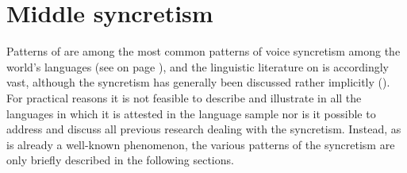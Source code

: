 \section{Middle syncretism} \label{sec:simple-syncretism:middle}
Patterns of  are among the most common patterns of voice syncretism among the world’s languages (see  on page \pageref{tab:ch6:voice-syncretism-simplex}), and the linguistic literature on  is accordingly vast, although the syncretism has generally been discussed rather implicitly (). For practical reasons it is not feasible to describe and illustrate  in all the languages in which it is attested in the language sample nor is it possible to address and discuss all previous research dealing with the syncretism. Instead, as  is already a well-known phenomenon, the various patterns of the syncretism are only briefly described in the following sections. 


